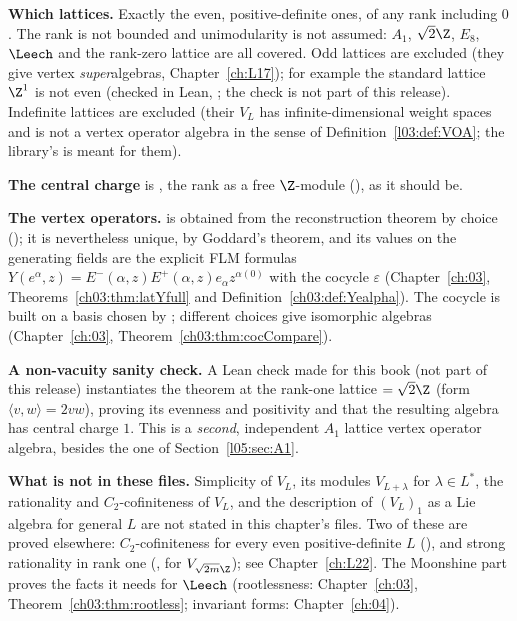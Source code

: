 \begin{dictionary}
\textbf{Which lattices.} Exactly the even, positive-definite ones, of any rank including $0$. The rank is
not bounded and unimodularity is not assumed: $A_1$, $\sqrt2\Z$, $E_8$, $\Leech$ and the rank-zero lattice are all
covered. Odd lattices are excluded (they give vertex \emph{super}algebras, Chapter~\ref{ch:L17}); for example the
standard lattice $\Z^1$ is not even (checked in Lean, ; the check is not part of this release). Indefinite lattices are excluded
(their $V_L$ has infinite-dimensional weight spaces and is not a vertex operator algebra in the sense of
Definition~\ref{l03:def:VOA}; the library's  is meant for them).

\textbf{The central charge} is , the rank as a free $\Z$-module (), as it
should be.

\textbf{The vertex operators.}  is obtained from the reconstruction theorem by choice
(); it is nevertheless unique, by Goddard's theorem, and its values on the generating fields are
the explicit FLM formulas $Y(e^\alpha,z)=E^-(\alpha,z)E^+(\alpha,z)e_\alpha z^{\alpha(0)}$ with the cocycle
$\varepsilon$ (Chapter~\ref{ch:03}, Theorems~\ref{ch03:thm:latYfull} and Definition~\ref{ch03:def:Yealpha}).
The cocycle is built on a basis chosen by ; different choices give isomorphic
algebras (Chapter~\ref{ch:03}, Theorem~\ref{ch03:thm:cocCompare}).

\textbf{A non-vacuity sanity check.} A Lean check made for this book (not part of this release)
instantiates the theorem at the rank-one lattice  $=\sqrt2\Z$ (form $\langle v,w\rangle=2vw$),
proving its evenness and positivity and that the resulting algebra  has central charge
$1$. This is a \emph{second}, independent $A_1$ lattice vertex operator algebra, besides the one of
Section~\ref{l05:sec:A1}.

\textbf{What is not in these files.} Simplicity of $V_L$, its modules $V_{L+\lambda}$ for $\lambda\in L^*$, the
rationality and $C_2$-cofiniteness of $V_L$, and the description of $(V_L)_1$ as a Lie algebra for general $L$
are not stated in this chapter's files. Two of these are proved elsewhere: $C_2$-cofiniteness for every even
positive-definite $L$ (), and strong rationality in rank one
(, for $V_{\sqrt{2m}\Z}$); see Chapter~\ref{ch:L22}. The Moonshine part proves the facts it needs for $\Leech$ (rootlessness:
Chapter~\ref{ch:03}, Theorem~\ref{ch03:thm:rootless}; invariant forms: Chapter~\ref{ch:04}).
\end{dictionary}

